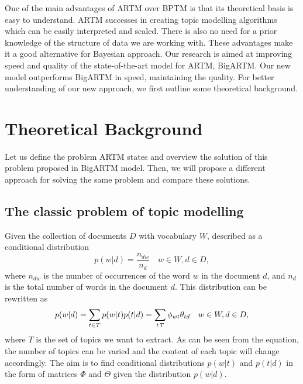 \documentclass{article}
\begin{document}
One of the main advantages of ARTM over BPTM is that its theoretical basis is easy to understand. ARTM successes in creating topic modelling algorithms which can be easily interpreted and scaled. There is also no need for a prior knowledge of the structure of data we are working with. These advantages make it a good alternative for Bayesian approach. Our research is aimed at improving speed and quality of the state-of-the-art model for ARTM, BigARTM. Our new model outperforms BigARTM in speed, maintaining the quality. For better understanding of our new approach, we first outline some theoretical background. \\


\section{\centering Theoretical Background}
\label{sec:theoretical-background}
Let us define the problem ARTM states and overview the solution of this problem proposed in BigARTM model. Then, we will propose a different approach for solving the same problem and compare these solutions.\\

\subsection{The classic problem of topic modelling}
Given the collection of documents $D$ with vocabulary $W$, described as a conditional distribution
\begin{equation}
    p(w|d) = \frac{n_{dw}}{n_{d}} \quad w \in W, d \in D,
\end{equation}
where $n_{dw}$ is the number of occurrences of the word $w$ in the document $d$, and $n_{d}$ is the total number of words in the document $d$. This distribution can be rewritten as
\begin{equation}
    p(w|d) = \sum_{t \in T}p(w|t)p(t|d) = \sum_{t \it T} \phi_{wt}\theta_{td} \quad w \in W, d \in D,
\end{equation}
where $T$ is the set of topics we want to extract. As can be seen from the equation, the number of topics can be varied and the content of each topic will change accordingly. The aim is to find conditional distributions $p(w|t)$ and $p(t|d)$ in the form of matrices $\Phi$ and $\Theta$ given the distribution $p(w|d)$. 
\end{document}

